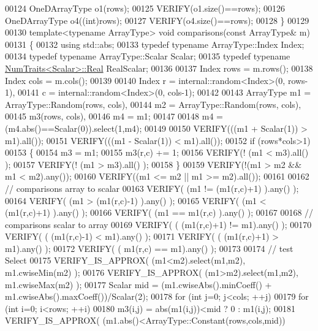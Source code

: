 \begin{DoxyCode}
00124   OneDArrayType o1(rows);
00125   VERIFY(o1.size()==rows);
00126   OneDArrayType o4((\textcolor{keywordtype}{int})rows);
00127   VERIFY(o4.size()==rows);
00128 \}
00129 
00130 \textcolor{keyword}{template}<\textcolor{keyword}{typename} ArrayType> \textcolor{keywordtype}{void} comparisons(\textcolor{keyword}{const} ArrayType& m)
00131 \{
00132   \textcolor{keyword}{using} std::abs;
00133   \textcolor{keyword}{typedef} \textcolor{keyword}{typename} ArrayType::Index Index;
00134   \textcolor{keyword}{typedef} \textcolor{keyword}{typename} ArrayType::Scalar Scalar;
00135   \textcolor{keyword}{typedef} \textcolor{keyword}{typename} \hyperlink{group___core___module_struct_eigen_1_1_num_traits}{NumTraits<Scalar>::Real} RealScalar;
00136 
00137   Index rows = m.rows();
00138   Index cols = m.cols();
00139 
00140   Index r = internal::random<Index>(0, rows-1),
00141         c = internal::random<Index>(0, cols-1);
00142 
00143   ArrayType m1 = ArrayType::Random(rows, cols),
00144             m2 = ArrayType::Random(rows, cols),
00145             m3(rows, cols),
00146             m4 = m1;
00147   
00148   m4 = (m4.abs()==Scalar(0)).select(1,m4);
00149 
00150   VERIFY(((m1 + Scalar(1)) > m1).all());
00151   VERIFY(((m1 - Scalar(1)) < m1).all());
00152   \textcolor{keywordflow}{if} (rows*cols>1)
00153   \{
00154     m3 = m1;
00155     m3(r,c) += 1;
00156     VERIFY(! (m1 < m3).all() );
00157     VERIFY(! (m1 > m3).all() );
00158   \}
00159   VERIFY(!(m1 > m2 && m1 < m2).any());
00160   VERIFY((m1 <= m2 || m1 >= m2).all());
00161 
00162   \textcolor{comment}{// comparisons array to scalar}
00163   VERIFY( (m1 != (m1(r,c)+1) ).any() );
00164   VERIFY( (m1 >  (m1(r,c)-1) ).any() );
00165   VERIFY( (m1 <  (m1(r,c)+1) ).any() );
00166   VERIFY( (m1 ==  m1(r,c)    ).any() );
00167 
00168   \textcolor{comment}{// comparisons scalar to array}
00169   VERIFY( ( (m1(r,c)+1) != m1).any() );
00170   VERIFY( ( (m1(r,c)-1) <  m1).any() );
00171   VERIFY( ( (m1(r,c)+1) >  m1).any() );
00172   VERIFY( (  m1(r,c)    == m1).any() );
00173 
00174   \textcolor{comment}{// test Select}
00175   VERIFY\_IS\_APPROX( (m1<m2).select(m1,m2), m1.cwiseMin(m2) );
00176   VERIFY\_IS\_APPROX( (m1>m2).select(m1,m2), m1.cwiseMax(m2) );
00177   Scalar mid = (m1.cwiseAbs().minCoeff() + m1.cwiseAbs().maxCoeff())/Scalar(2);
00178   \textcolor{keywordflow}{for} (\textcolor{keywordtype}{int} j=0; j<cols; ++j)
00179   \textcolor{keywordflow}{for} (\textcolor{keywordtype}{int} i=0; i<rows; ++i)
00180     m3(i,j) = abs(m1(i,j))<mid ? 0 : m1(i,j);
00181   VERIFY\_IS\_APPROX( (m1.abs()<ArrayType::Constant(rows,cols,mid))

\end{DoxyCode}
